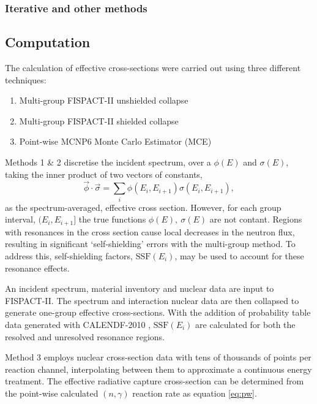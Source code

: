 \subsubsection{Iterative and other methods}

\subsection{Computation}

The calculation of effective cross-sections were carried out using three different techniques:

\begin{enumerate}
  \item Multi-group FISPACT-II unshielded collapse
  \item Multi-group FISPACT-II shielded collapse
  \item Point-wise MCNP6 Monte Carlo Estimator (MCE)
\end{enumerate}

Methods 1 \& 2 discretise the incident spectrum, over a  $\phi(E)$ and $\sigma(E)$, taking the inner product of two vectors of constants,
$$\vec{\phi} \cdot \vec{\sigma} = \sum_i \phi(E_i , E_{i+1}) \sigma(E_i , E_{i+1}),$$
as the spectrum-averaged, effective cross section. However, for each group interval, $(E_{i}, E_{i+1}]$ the true functions $\phi(E),\ \sigma(E)$ are not contant. Regions with resonances in the cross section cause local decreases in the neutron flux, resulting in significant `self-shielding' errors with the multi-group method. To address this, self-shielding factors, $\mathrm{SSF}(E_i)$, may be used to account for these resonance effects. 

An incident spectrum, material inventory and nuclear data are input to FISPACT-II. The spectrum and interaction nuclear data are then collapsed to generate one-group effective cross-sections. With the addition of probability table data generated with CALENDF-2010 \cite{sublet2011}, $\mathrm{SSF}(E_i)$ are calculated for both the resolved and unresolved resonance regions.

Method 3 employs nuclear cross-section data with tens of thousands of points per reaction channel, interpolating between them to approximate a continuous energy treatment. The effective radiative capture cross-section can be determined from the point-wise calculated $(n,\gamma)$ reaction rate as equation \ref{eq:pw}. 

